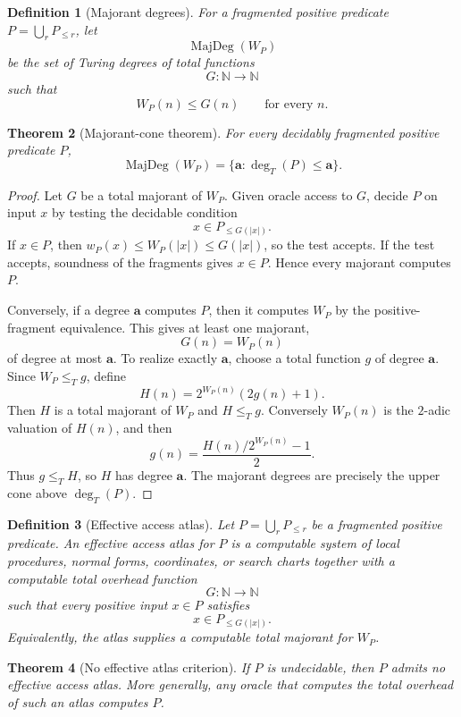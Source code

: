 \documentclass[11pt]{article}
\newtheorem{theorem}{Theorem}[section]
\newtheorem{definition}[theorem]{Definition}
\begin{document}
\begin{definition}[Majorant degrees]
For a fragmented positive predicate \(P=\bigcup_r P_{\le r}\), let
\[
\operatorname{MajDeg}(W_P)
\]
be the set of Turing degrees of total functions
\[
G:\mathbb N\to\mathbb N
\]
such that
\[
W_P(n)\le G(n)
\qquad
\text{for every }n.
\]
\end{definition}

\begin{theorem}[Majorant-cone theorem]
For every decidably fragmented positive predicate \(P\),
\[
\operatorname{MajDeg}(W_P)
=
\{\mathbf a:\deg_T(P)\le \mathbf a\}.
\]
\end{theorem}

\begin{proof}
Let \(G\) be a total majorant of \(W_P\). Given oracle access to \(G\), decide \(P\) on input \(x\) by testing the decidable condition
\[
x\in P_{\le G(|x|)}.
\]
If \(x\in P\), then \(w_P(x)\le W_P(|x|)\le G(|x|)\), so the test accepts. If the test accepts, soundness of the fragments gives \(x\in P\). Hence every majorant computes \(P\).

Conversely, if a degree \(\mathbf a\) computes \(P\), then it computes \(W_P\) by the positive-fragment equivalence. This gives at least one majorant,
\[
G(n)=W_P(n)
\]
of degree at most \(\mathbf a\). To realize exactly \(\mathbf a\), choose a total function \(g\) of degree \(\mathbf a\). Since \(W_P\le_T g\), define
\[
H(n)=2^{W_P(n)}(2g(n)+1).
\]
Then \(H\) is a total majorant of \(W_P\) and \(H\le_T g\). Conversely \(W_P(n)\) is the \(2\)-adic valuation of \(H(n)\), and then
\[
g(n)=\frac{H(n)/2^{W_P(n)}-1}{2}.
\]
Thus \(g\le_T H\), so \(H\) has degree \(\mathbf a\). The majorant degrees are precisely the upper cone above \(\deg_T(P)\).
\end{proof}

\begin{definition}[Effective access atlas]
Let \(P=\bigcup_rP_{\le r}\) be a fragmented positive predicate. An effective access atlas for \(P\) is a computable system of local procedures, normal forms, coordinates, or search charts together with a computable total overhead function
\[
G:\mathbb N\to\mathbb N
\]
such that every positive input \(x\in P\) satisfies
\[
x\in P_{\le G(|x|)}.
\]
Equivalently, the atlas supplies a computable total majorant for \(W_P\).
\end{definition}

\begin{theorem}[No effective atlas criterion]
If \(P\) is undecidable, then \(P\) admits no effective access atlas. More generally, any oracle that computes the total overhead of such an atlas computes \(P\).
\end{theorem}
\end{document}
